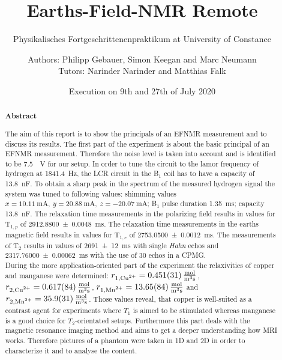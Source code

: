 \title{Earths-Field-NMR Remote}
\subtitle{Physikalisches Fortgeschrittenenpraktikum at University of Constance}
\author{Authors: Philipp Gebauer, Simon Keegan and Marc Neumann \\ \large{Tutors: Narinder Narinder and Matthias Falk}}
\date{Execution on 9th and 27th of July 2020}
\maketitle
\begin{abstract}
    \begin{center}
        \Large{\textsf{\textbf{Abstract}}}
    \end{center}
    \vspace{0.75 cm}
    \begin{singlespace}
    \noindent The aim of this report is to show the principals of an EFNMR measurement and to discuss its results.\newline
    The first part of the experiment is about the basic principal of an EFNMR measurement.
    Therefore the noise level is taken into account and is identified to be \SI{7.5}{\mu \volt} for our setup.
    In order to tune the circuit to the lamor frequency of hydrogen at \SI{1841.4}{\hertz}, the LCR circuit in the B$_1$ coil has to have a capacity of \SI{13.8}{\nano \farad}.
    To obtain a sharp peak in the spectrum of the measured hydrogen signal the system was tuned to following values: shimming values $x = \SI{10.11}{\milli \ampere}, \ y = \SI{20.88}{\milli \ampere}, \ z = \SI{-20.07}{\milli \ampere}$; B$_1$ pulse duration \SI{1.35}{\milli \second}; capacity \SI{13.8}{\nano \farad}.
    The relaxation time measurements in the polarizing field results in values for T$_{1,p}$ of \SI{2912.8800 \pm 0.0048}{\milli \second}.
    The relaxation time measurements in the earths magnetic field results in values for T$_{1,e}$ of \SI{2753.0500 \pm 0.0012}{\milli \second}.
    The measurements of T$_2$ results in values of \SI{2691 \pm 12}{\milli \second} with single \textit{Hahn} echos and \SI{2317.76000 \pm 0.00062}{\milli \second} with the use of 30 echos in a CPMG.\\
    During the more application-oriented part of the experiment the relaxivities of copper and manganese were determined: $r_{1,\text{\ce{Cu^2+}}} = \SI{0.451 \pm 0.031}{\frac{\mol}{\metre \cubed \second}}$, $r_{2,\text{\ce{Cu^2+}}} = \SI{0.617 \pm 0.084}{\frac{\mol}{\metre \cubed \second}}$, $r_{1,\text{\ce{Mn^2+}}} = \SI{13.65 \pm 0.84}{\frac{\mol}{\metre \cubed \second}}$ and $r_{2,\text{\ce{Mn^2+}}} = \SI{35.9 \pm 3.1}{\frac{\mol}{\metre \cubed \second}}$. Those values reveal, that copper is well-suited as a contrast agent for experiments where $T_1$ is aimed to be stimulated whereas manganese is a good choice for $T_2$-orientated setups.
    Furthermore this part deals with the magnetic resonance imaging method and aims to get a deeper understanding how MRI works. Therefore pictures of a phantom were taken in 1D and 2D in order to characterize it and to analyse the content.


\end{singlespace}
\end{abstract}
